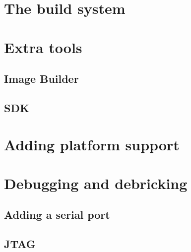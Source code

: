 \documentclass[a4paper]{book}
\begin{document}
  \section{The build system}
    
  \section{Extra tools}
    \subsection{Image Builder}
    \subsection{SDK}
  \section{Adding platform support}
  \section{Debugging and debricking}
    \subsection{Adding a serial port}
    \subsection{JTAG}
\end{document}
